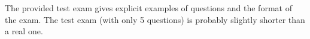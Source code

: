 The provided test exam gives explicit examples of questions and the format of the exam. The test exam (with only 5 questions) is probably slightly shorter than a real one.













